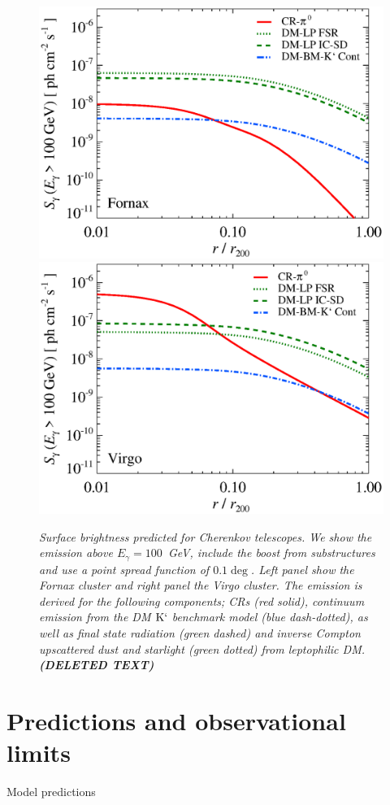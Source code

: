 \documentclass[10pt,aps,pra,reprint,amsmath,amsfonts,amssymb,showpacs]{revtex4-1}
\def\del#1{{\bf (DELETED TEXT)}}
\newcommand{\rmn}{\mathrm}
\newcommand{\Kp}{\rmn{K}`}
\newcommand{\eg}{E_\gamma}
\begin{document}
\begin{figure}
\begin{minipage}{2.0\columnwidth}
  \includegraphics[width=0.49\columnwidth]{figures/SB.Fornax.v9.SF300.SubMass.elmu.eps}
  \includegraphics[width=0.49\columnwidth]{figures/SB.Virgo.v9.SF300.SubMass.elmu.eps}
\caption{\it Surface brightness predicted for Cherenkov telescopes. We
  show the emission above $\eg=100$~GeV, include the boost from
  substructures and use a point spread function of $0.1\deg$. Left
  panel show the Fornax cluster and right panel the Virgo cluster. The
  emission is derived for the following components; CRs (red solid),
  continuum emission from the DM $\Kp$ benchmark model (blue
  dash-dotted), as well as final state radiation (green dashed) and
  inverse Compton upscattered dust and starlight (green dotted) from
  leptophilic DM. \del{GeV energies give rise to small BM model fluxes
    but high LP fluxes, other words BM models good for Cerenkov
    telescopes and LP good for Fermi (although the flat LP spectra
    give rise to high fluxes at high energies as well).}}
 \label{fig13}
\end{minipage}
\end{figure}



\section{Predictions and observational limits}
Model predictions
\end{document}
